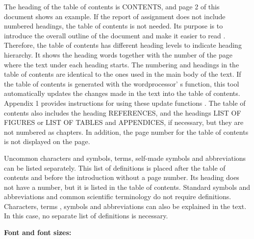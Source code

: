 \documentclass{article}
\begin{document}
The heading of the table of contents is CONTENTS, and page 2 of 
this document shows an example. If the report of assignment does not include 
numbered headings, the table of contents is not needed. Its purpose is 
to introduce the overall outline of the document and make it easier to read
. Therefore, the table of contents has different heading levels to indicate heading 
hierarchy. It shows the heading words together with the number of the page 
where the text under each heading starts. The numbering and headings in the 
table of contents are identical to the ones used in the main body of 
the text. If the table of contents is generated with the wordprocessor’
s function, this tool automatically updates the changes made in the text into 
the table of contents. Appendix 1 provides instructions for using these update functions
. The table of contents also includes the heading REFERENCES, and the headings 
LIST OF FIGURES or LIST OF TABLES and APPENDICES, if necessary, but 
they are not numbered as chapters. In addition, the page number for 
the table of contents is not displayed on the page. 

Uncommon characters and symbols, terms, self-made symbols and abbreviations can be listed separately. This list of definitions is placed after the table of contents and 
before the introduction without a page number. Its heading does not have a number, but it is listed in the table of contents. Standard symbols and abbreviations and common scientific terminology do not require definitions. Characters, terms
, symbols and abbreviations can also be explained in the text. In this case, no separate list of definitions is necessary. 


\textbf{Font and font sizes:}
\end{document}
